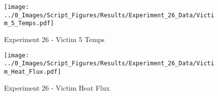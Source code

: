 	\begin{figure}[H]
		\centering
		\texttt{[image: ../0\_Images/Script\_Figures/Results/Experiment\_26\_Data/Victim\_5\_Temps.pdf]}
		\caption[]{Experiment 26 - Victim 5 Temps}
	\end{figure}
 
	\clearpage

	\begin{figure}[H]
		\centering
		\texttt{[image: ../0\_Images/Script\_Figures/Results/Experiment\_26\_Data/Victim\_Heat\_Flux.pdf]}
		\caption[]{Experiment 26 - Victim Heat Flux}
	\end{figure}
 

